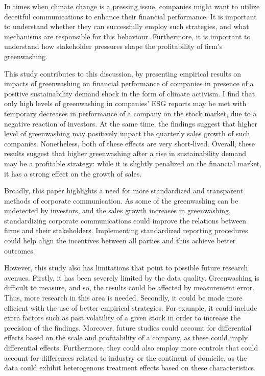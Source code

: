 \documentclass[12pt]{article}
\begin{document}
In times when climate change is a pressing issue, companies might want to utilize deceitful communications to enhance their financial performance. It is important to understand whether they can successfully employ such strategies, and what mechanisms are responsible for this behaviour. Furthermore, it is important to understand how stakeholder pressures shape the profitability of firm's greenwashing.

This study contributes to this discussion, by presenting empirical results on impacts of greenwashing on financial performance of companies in presence of a positive sustainability demand shock in the form of climate activism. I find that only high levels of greenwashing in companies' ESG reports may be met with temporary decreases in performance of a company on the stock market, due to a negative reaction of investors. At the same time, the findings suggest that higher level of greenwashing may positively impact the quarterly sales growth of such companies. Nonetheless, both of these effects are very short-lived. Overall, these results suggest that higher greenwashing after a rise in sustainability demand may be a profitable strategy: while it is slightly penalized on the financial market, it has a strong effect on the growth of sales.

Broadly, this paper highlights a need for more standardized and transparent methods of corporate communication. As some of the greenwashing can be undetected by investors, and the sales growth increases in greenwashing, standardizing corporate communications could improve the relations between firms and their stakeholders. Implementing standardized reporting procedures could help align the incentives between all parties and thus achieve better outcomes. 

However, this study also has limitations that point to possible future research avenues. Firstly, it has been severely limited by the data quality. Greenwashing is difficult to measure, and so, the results could be affected by measurement error. Thus, more research in this area is needed. Secondly, it could be made more efficient with the use of better empirical strategies. For example, it could include extra factors such as past volatility of a given stock in order to increase the precision of the findings. Moreover, future studies could account for differential effects based on the scale and profitability of a company, as these could imply differential effects. Furthermore, they could also employ more controls that could account for differences related to industry or the continent of domicile, as the data could exhibit heterogenous treatment effects based on these characteristics.  
\end{document}
